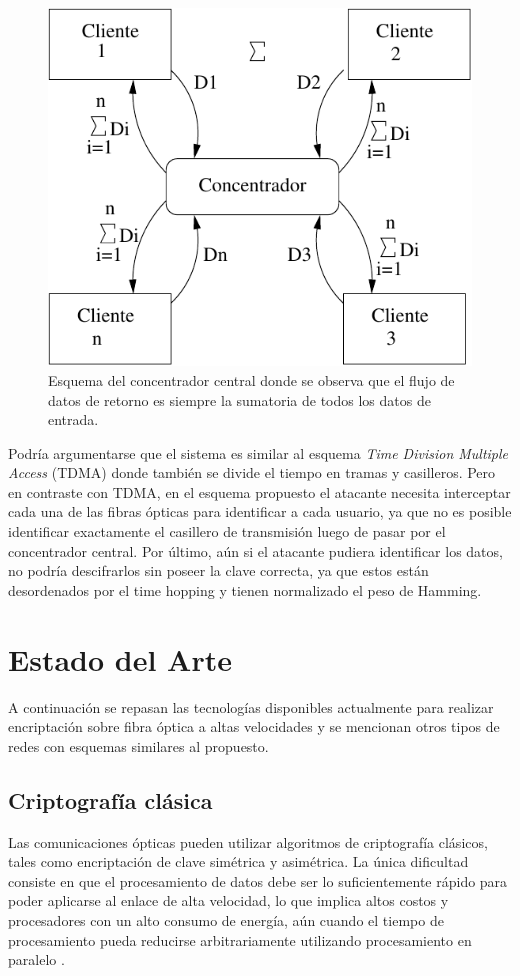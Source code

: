\begin{figure}[t]
  \centering
  \includegraphics[width=0.5 \textwidth]{graphs/concentrador} 
  \caption{Esquema del concentrador central donde se observa que el flujo de datos de retorno es siempre la sumatoria de todos los datos de entrada.}
  \label{fig_use}
\end{figure}

Podría argumentarse que el sistema es similar al esquema \textit{Time Division Multiple Access} (TDMA) donde también se divide el tiempo en tramas y casilleros. Pero en contraste con TDMA, en el esquema propuesto el atacante necesita interceptar cada una de las fibras ópticas para identificar a cada usuario, ya que no es posible identificar exactamente el casillero de transmisión luego de pasar por el concentrador central. Por último, aún si el atacante pudiera identificar los datos, no podría descifrarlos sin poseer la clave correcta, ya que estos están desordenados por el time hopping y tienen normalizado el peso de Hamming.


\section{Estado del Arte}

A continuación se repasan las tecnologías disponibles actualmente para realizar encriptación sobre fibra óptica a altas velocidades y se mencionan otros tipos de redes con esquemas similares al propuesto.

\subsection{Criptografía clásica}
Las comunicaciones ópticas pueden utilizar algoritmos de criptografía clásicos, tales como encriptación de clave simétrica y asimétrica. La única dificultad consiste en que el procesamiento de datos debe ser lo suficientemente rápido para poder aplicarse al enlace de alta velocidad, lo que implica altos costos y procesadores con un alto consumo de energía, aún cuando el tiempo de procesamiento pueda reducirse arbitrariamente utilizando procesamiento en paralelo \cite{liforward}.

